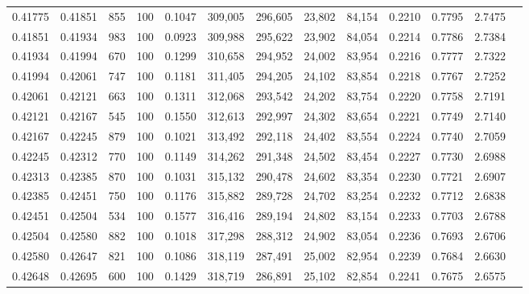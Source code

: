 \begin{tabular}{rrrrrrrrrrrrr}
0.41775 & 0.41851 &   855 & 100 &                                     0.1047 & 309,005 & 296,605 &  23,802 &  84,154 & 0.2210 & 0.7795 & 2.7475 \\
0.41851 & 0.41934 &   983 & 100 &                                     0.0923 & 309,988 & 295,622 &  23,902 &  84,054 & 0.2214 & 0.7786 & 2.7384 \\
0.41934 & 0.41994 &   670 & 100 &                                     0.1299 & 310,658 & 294,952 &  24,002 &  83,954 & 0.2216 & 0.7777 & 2.7322 \\
0.41994 & 0.42061 &   747 & 100 &                                     0.1181 & 311,405 & 294,205 &  24,102 &  83,854 & 0.2218 & 0.7767 & 2.7252 \\
0.42061 & 0.42121 &   663 & 100 &                                     0.1311 & 312,068 & 293,542 &  24,202 &  83,754 & 0.2220 & 0.7758 & 2.7191 \\
0.42121 & 0.42167 &   545 & 100 &                                     0.1550 & 312,613 & 292,997 &  24,302 &  83,654 & 0.2221 & 0.7749 & 2.7140 \\
0.42167 & 0.42245 &   879 & 100 &                                     0.1021 & 313,492 & 292,118 &  24,402 &  83,554 & 0.2224 & 0.7740 & 2.7059 \\
0.42245 & 0.42312 &   770 & 100 &                                     0.1149 & 314,262 & 291,348 &  24,502 &  83,454 & 0.2227 & 0.7730 & 2.6988 \\
0.42313 & 0.42385 &   870 & 100 &                                     0.1031 & 315,132 & 290,478 &  24,602 &  83,354 & 0.2230 & 0.7721 & 2.6907 \\
0.42385 & 0.42451 &   750 & 100 &                                     0.1176 & 315,882 & 289,728 &  24,702 &  83,254 & 0.2232 & 0.7712 & 2.6838 \\
0.42451 & 0.42504 &   534 & 100 &                                     0.1577 & 316,416 & 289,194 &  24,802 &  83,154 & 0.2233 & 0.7703 & 2.6788 \\
0.42504 & 0.42580 &   882 & 100 &                                     0.1018 & 317,298 & 288,312 &  24,902 &  83,054 & 0.2236 & 0.7693 & 2.6706 \\
0.42580 & 0.42647 &   821 & 100 &                                     0.1086 & 318,119 & 287,491 &  25,002 &  82,954 & 0.2239 & 0.7684 & 2.6630 \\
0.42648 & 0.42695 &   600 & 100 &                                     0.1429 & 318,719 & 286,891 &  25,102 &  82,854 & 0.2241 & 0.7675 & 2.6575 \\

\end{tabular}
